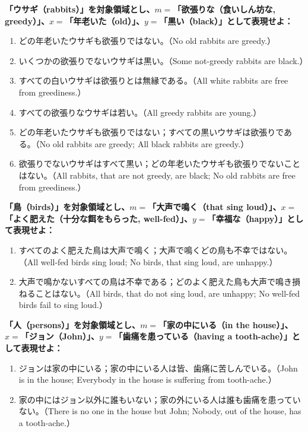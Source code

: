 \documentclass[a4paper,11pt,openany]{ltjsbook}
\begin{document}
\noindent\textbf{「ウサギ（rabbits）」を対象領域とし、$m=$「欲張りな（食いしん坊な, greedy）」、$x=$「年老いた（old）」、$y=$「黒い（black）」として表現せよ：}
\begin{enumerate}[label=\textbf{\arabic*.}, start=9]
\item どの年老いたウサギも欲張りではない。（No old rabbits are greedy.）
\item いくつかの欲張りでないウサギは黒い。（Some not-greedy rabbits are black.）
\item すべての白いウサギは欲張りとは無縁である。（All white rabbits are free from greediness.）
\item すべての欲張りなウサギは若い。（All greedy rabbits are young.）
\item どの年老いたウサギも欲張りではない；すべての黒いウサギは欲張りである。（No old rabbits are greedy; All black rabbits are greedy.）
\item 欲張りでないウサギはすべて黒い；どの年老いたウサギも欲張りでないことはない。（All rabbits, that are not greedy, are black; No old rabbits are free from greediness.）
\end{enumerate}

\noindent\textbf{「鳥（birds）」を対象領域とし、$m=$「大声で鳴く（that sing loud）」、$x=$「よく肥えた（十分な餌をもらった, well-fed）」、$y=$「幸福な（happy）」として表現せよ：}
\begin{enumerate}[label=\textbf{\arabic*.}, start=15]
\item すべてのよく肥えた鳥は大声で鳴く；大声で鳴くどの鳥も不幸ではない。（All well-fed birds sing loud; No birds, that sing loud, are unhappy.）
\item 大声で鳴かないすべての鳥は不幸である；どのよく肥えた鳥も大声で鳴き損ねることはない。（All birds, that do not sing loud, are unhappy; No well-fed birds fail to sing loud.）
\end{enumerate}

\noindent\textbf{「人（persons）」を対象領域とし、$m=$「家の中にいる（in the house）」、$x=$「ジョン（John）」、$y=$「歯痛を患っている（having a tooth-ache）」として表現せよ：}
\begin{enumerate}[label=\textbf{\arabic*.}, start=17]
\item ジョンは家の中にいる；家の中にいる人は皆、歯痛に苦しんでいる。（John is in the house; Everybody in the house is suffering from tooth-ache.）
\item 家の中にはジョン以外に誰もいない；家の外にいる人は誰も歯痛を患っていない。（There is no one in the house but John; Nobody, out of the house, has a tooth-ache.）
\end{enumerate}
\end{document}
